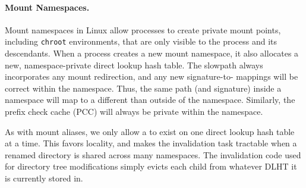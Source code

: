 
\paragraph{Mount Namespaces.} Mount namespaces in Linux allow processes
to create private mount points, including {\tt chroot} environments, 
that are only visible to the process and its descendants.
When a process creates a new mount namespace, it also allocates a new, namespace-private direct lookup hash table.
The slowpath always incorporates any mount redirection, and any new signature-to-\dentry{} mappings will be correct
within the namespace.
Thus, the same path (and signature) inside a namespace will map to a different \dentry{} than outside of the namespace.
Similarly, the prefix check cache (PCC) will always be private within the namespace.

As with mount aliases, we only allow a \dentry{} to exist on one direct lookup hash table at a time.
This favors locality, and makes the invalidation task tractable when a renamed directory is shared across many namespaces.
The invalidation code used for directory tree modifications simply evicts each child \dentry{} from whatever
DLHT it is currently stored in.


